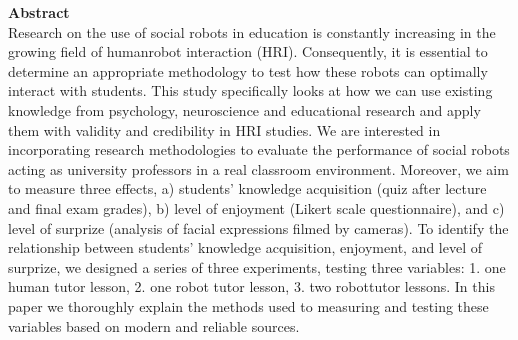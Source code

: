 \documentclass[report.tex]{subfiles}
\begin{document}
\noindent\textbf{Abstract} \\
Research on the use of social robots in education is constantly increasing in the growing field of humanrobot interaction (HRI). Consequently, it is essential to determine an appropriate methodology to test how these robots can optimally interact with students. This study specifically looks at how we can use existing knowledge from psychology, neuroscience and educational research and apply them with validity and credibility in HRI studies. We are interested in incorporating research methodologies to evaluate the performance of social robots acting as university professors in a real classroom environment. Moreover, we aim to measure three effects, a) students’ knowledge acquisition (quiz after lecture and final exam grades), b) level of enjoyment (Likert scale questionnaire), and c) level of surprize (analysis of facial expressions filmed by cameras). To identify the relationship between students’ knowledge acquisition, enjoyment, and level of surprize, we designed a series of three experiments, testing three variables: 1. one human tutor lesson, 2. one robot tutor lesson, 3. two robottutor lessons. In this paper we thoroughly explain the methods used to measuring and testing these variables based on modern and reliable sources.\\
\end{document}

